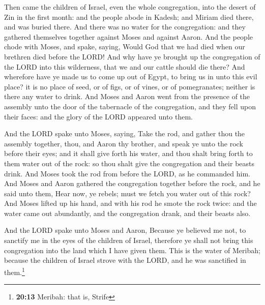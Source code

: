  Then came the children of Israel, even the whole
congregation, into the desert of Zin in the first month: and the people
abode in Kadesh; and Miriam died there, and was buried there.
 And there was no water for the congregation: and they
gathered themselves together against Moses and against Aaron.
 And the people chode with Moses, and spake, saying, Would
God that we had died when our brethren died before the LORD!
 And why have ye brought up the congregation of the LORD
into this wilderness, that we and our cattle should die there?
 And wherefore have ye made us to come up out of Egypt, to
bring us in unto this evil place? it is no place of seed, or of figs, or
of vines, or of pomegranates; neither is there any water to drink.
 And Moses and Aaron went from the presence of the
assembly unto the door of the tabernacle of the congregation, and they
fell upon their faces: and the glory of the LORD appeared unto them.

 And the LORD spake unto Moses, saying, 
Take the rod, and gather thou the assembly together, thou, and Aaron thy
brother, and speak ye unto the rock before their eyes; and it shall give
forth his water, and thou shalt bring forth to them water out of the
rock: so thou shalt give the congregation and their beasts drink.
 And Moses took the rod from before the LORD, as he
commanded him.  And Moses and Aaron gathered the
congregation together before the rock, and he said unto them, Hear now,
ye rebels; must we fetch you water out of this rock?  And
Moses lifted up his hand, and with his rod he smote the rock twice: and
the water came out abundantly, and the congregation drank, and their
beasts also.

 And the LORD spake unto Moses and Aaron, Because ye
believed me not, to sanctify me in the eyes of the children of Israel,
therefore ye shall not bring this congregation into the land which I
have given them.  This is the water of Meribah; because
the children of Israel strove with the LORD, and he was sanctified in
them.\footnote{\textbf{20:13} Meribah: that is, Strife}

